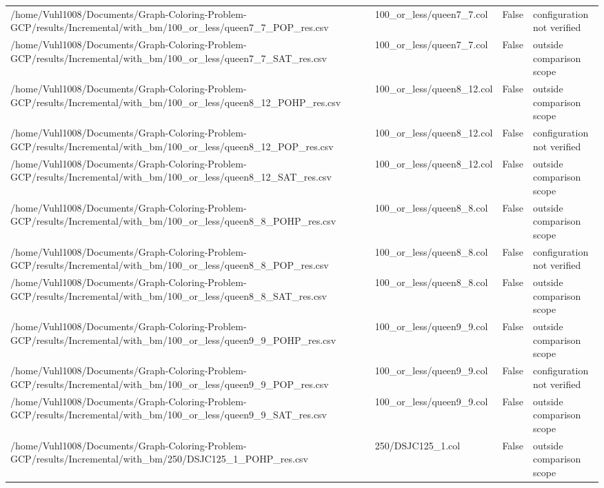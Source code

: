 \begin{table}[htbp]
\begin{tabular}{llll}
/home/Vuhl1008/Documents/Graph-Coloring-Problem-GCP/results/Incremental/with\_bm/100\_or\_less/queen7\_7\_POP\_res.csv & 100\_or\_less/queen7\_7.col & False & configuration not verified \\
/home/Vuhl1008/Documents/Graph-Coloring-Problem-GCP/results/Incremental/with\_bm/100\_or\_less/queen7\_7\_SAT\_res.csv & 100\_or\_less/queen7\_7.col & False & outside comparison scope \\
/home/Vuhl1008/Documents/Graph-Coloring-Problem-GCP/results/Incremental/with\_bm/100\_or\_less/queen8\_12\_POHP\_res.csv & 100\_or\_less/queen8\_12.col & False & outside comparison scope \\
/home/Vuhl1008/Documents/Graph-Coloring-Problem-GCP/results/Incremental/with\_bm/100\_or\_less/queen8\_12\_POP\_res.csv & 100\_or\_less/queen8\_12.col & False & configuration not verified \\
/home/Vuhl1008/Documents/Graph-Coloring-Problem-GCP/results/Incremental/with\_bm/100\_or\_less/queen8\_12\_SAT\_res.csv & 100\_or\_less/queen8\_12.col & False & outside comparison scope \\
/home/Vuhl1008/Documents/Graph-Coloring-Problem-GCP/results/Incremental/with\_bm/100\_or\_less/queen8\_8\_POHP\_res.csv & 100\_or\_less/queen8\_8.col & False & outside comparison scope \\
/home/Vuhl1008/Documents/Graph-Coloring-Problem-GCP/results/Incremental/with\_bm/100\_or\_less/queen8\_8\_POP\_res.csv & 100\_or\_less/queen8\_8.col & False & configuration not verified \\
/home/Vuhl1008/Documents/Graph-Coloring-Problem-GCP/results/Incremental/with\_bm/100\_or\_less/queen8\_8\_SAT\_res.csv & 100\_or\_less/queen8\_8.col & False & outside comparison scope \\
/home/Vuhl1008/Documents/Graph-Coloring-Problem-GCP/results/Incremental/with\_bm/100\_or\_less/queen9\_9\_POHP\_res.csv & 100\_or\_less/queen9\_9.col & False & outside comparison scope \\
/home/Vuhl1008/Documents/Graph-Coloring-Problem-GCP/results/Incremental/with\_bm/100\_or\_less/queen9\_9\_POP\_res.csv & 100\_or\_less/queen9\_9.col & False & configuration not verified \\
/home/Vuhl1008/Documents/Graph-Coloring-Problem-GCP/results/Incremental/with\_bm/100\_or\_less/queen9\_9\_SAT\_res.csv & 100\_or\_less/queen9\_9.col & False & outside comparison scope \\
/home/Vuhl1008/Documents/Graph-Coloring-Problem-GCP/results/Incremental/with\_bm/250/DSJC125\_1\_POHP\_res.csv & 250/DSJC125\_1.col & False & outside comparison scope \\

\end{tabular}
\end{table}
